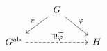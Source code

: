 \documentclass{article}
\begin{document}
    \begin{equation*}
        \begin{tikzcd}
            & G \ar[dl, "\pi"'] \ar[dr, "\phi"] \\
            G^\textrm{ab} \ar[rr, "\ex!\widetilde{\phi}", dashed] & & H
        \end{tikzcd}
    \end{equation*}
\end{document}
